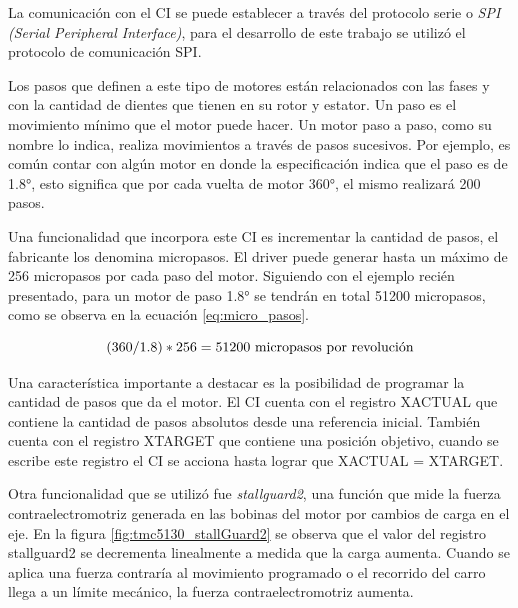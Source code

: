 La comunicación con el CI se puede establecer a través del protocolo serie o \textit{SPI (Serial Peripheral Interface)}, para el desarrollo de este trabajo se utilizó el protocolo de comunicación SPI.

Los pasos que definen a este tipo de motores están relacionados con las fases y con la cantidad de dientes que tienen en su rotor y estator. Un paso es el movimiento mínimo que el motor puede hacer. Un motor paso a paso, como su nombre lo indica, realiza movimientos a través de pasos sucesivos. Por ejemplo, es común contar con algún motor en donde la especificación indica que el paso es de \ang{1.8}, esto significa que por cada vuelta de motor \ang{360}, el mismo realizará 200 pasos.

Una funcionalidad que incorpora este CI es incrementar la cantidad de pasos, el fabricante los denomina micropasos. El driver puede generar hasta un máximo de 256 micropasos por cada paso del motor. Siguiendo con el ejemplo recién presentado, para un motor de paso \ang{1.8} se tendrán en total 51200 micropasos, como se observa en la ecuación \ref{eq:micro_pasos}.

\begin{equation}
	\label{eq:micro_pasos}
		(360/1.8) * 256 = 51200 \textup{ micropasos por revolución}
\end{equation}


Una característica importante a destacar es la posibilidad de programar la cantidad de pasos que da el motor. El CI cuenta con el registro XACTUAL que contiene la cantidad de pasos absolutos desde una referencia inicial. También cuenta con el registro XTARGET que contiene una posición objetivo, cuando se escribe este registro el CI se acciona hasta lograr que XACTUAL = XTARGET.


Otra funcionalidad que se utilizó fue \textit{stallguard2}, una función que mide la fuerza contraelectromotriz generada en las bobinas del motor por cambios de carga en el eje. En la figura \ref{fig:tmc5130_stallGuard2} se observa que el valor del registro stallguard2 se decrementa linealmente a medida que la carga aumenta. Cuando se aplica una fuerza contraría al movimiento programado o el recorrido del carro llega a un límite mecánico, la fuerza contraelectromotriz aumenta. 

